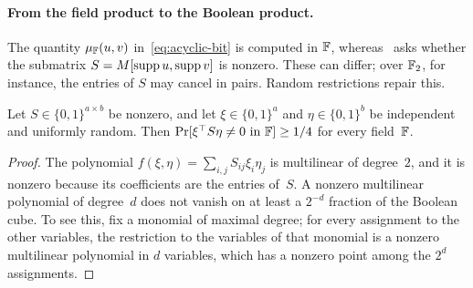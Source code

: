 \paragraph{From the field product to the Boolean product.}
The quantity $\mu_{\mathbb{F}}(u,v)$ in~\eqref{eq:acyclic-bit} is computed in $\mathbb{F}$, whereas \OuMv\ asks whether the submatrix $S=M[\operatorname{supp} u,\operatorname{supp} v]$ is nonzero.
These can differ; over $\mathbb{F}_2$, for instance, the entries of $S$ may cancel in pairs.
Random restrictions repair this.
\begin{lemma}\label{lem:isolation}
Let $S\in\{0,1\}^{a\times b}$ be nonzero, and let $\xi\in\{0,1\}^a$ and $\eta\in\{0,1\}^b$ be independent and uniformly random.
Then $\Pr[\xi^{\top}S\eta\ne0\text{ in }\mathbb{F}]\ge1/4$ for every field~$\mathbb{F}$.
\end{lemma}
\begin{proof}
The polynomial $f(\xi,\eta)=\sum_{i,j}S_{ij}\xi_i\eta_j$ is multilinear of degree~$2$, and it is nonzero because its coefficients are the entries of~$S$.
A nonzero multilinear polynomial of degree~$d$ does not vanish on at least a $2^{-d}$ fraction of the Boolean cube.
To see this, fix a monomial of maximal degree; for every assignment to the other variables, the restriction to the variables of that monomial is a nonzero multilinear polynomial in $d$ variables, which has a nonzero point among the $2^d$ assignments.
\end{proof}

